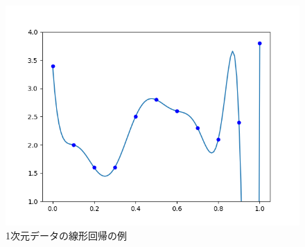 \documentclass[a4paper,11pt]{jsreport}
\begin{document}
\begin{figure}[H]
\begin{minipage}[b]{0.3\linewidth}
  \end{minipage}
  \begin{minipage}[b]{0.3\linewidth}
    \centering
    \includegraphics[keepaspectratio, scale=0.3]{image/多項式回帰(c).png}
  \end{minipage}
  \caption{1次元データの線形回帰の例}
  \label{線形回帰}
\end{figure}
\end{document}
